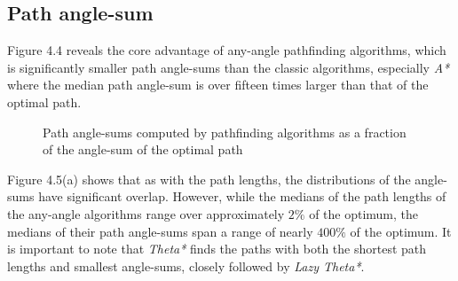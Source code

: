 \documentclass[12pt,notitlepage]{report}
\begin{document}
\subsection{Path angle-sum}

Figure 4.4 reveals the core advantage of any-angle pathfinding algorithms, which is significantly smaller path angle-sums than the classic algorithms, especially {\em A*} where the median path angle-sum is over fifteen times larger than that of the optimal path.\\

\begin{figure}
\centering

\caption[Path angle-sums computed by pathfinding algorithms]{Path angle-sums computed by pathfinding algorithms as a fraction of the angle-sum of the optimal path}
\end{figure}

\noindent
Figure 4.5(a) shows that as with the path lengths, the distributions of the angle-sums have significant overlap. However, while the medians of the path lengths of the any-angle algorithms range over approximately $2\%$ of the optimum, the medians of their path angle-sums span a range of nearly $400\%$ of the optimum. It is important to note that {\em Theta*} finds the paths with both the shortest path lengths and smallest angle-sums, closely followed by {\em Lazy Theta*}.\\
\end{document}
